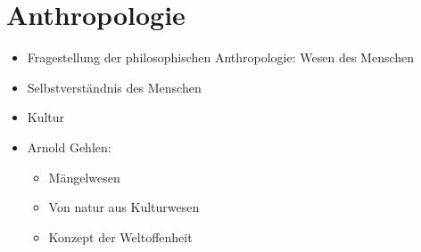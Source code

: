 
\section{Anthropologie}

\begin{itemize}
    \item Fragestellung der philosophischen Anthropologie: Wesen des Menschen
    \item Selbstverständnis des Menschen
    \item Kultur
    \item Arnold Gehlen:
    \begin{itemize}
        \item Mängelwesen
        \item Von natur aus Kulturwesen
        \item Konzept der Weltoffenheit
    \end{itemize}
\end{itemize}

